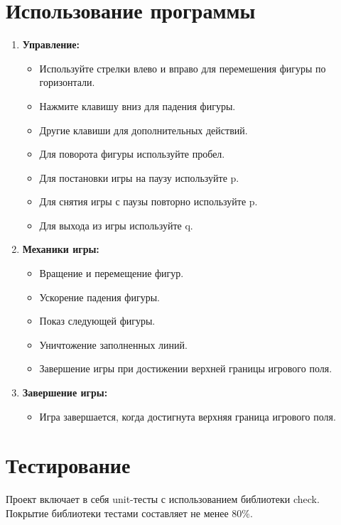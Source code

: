 \documentclass[a4paper,12pt]{article}
\begin{document}
\section{Использование программы}

\begin{enumerate}
    \item \textbf{Управление:}
        \begin{itemize}
            \item Используйте стрелки влево и вправо для перемешения фигуры по горизонтали.
            \item Нажмите клавишу вниз для падения фигуры.
            \item Другие клавиши для дополнительных действий.
            \item Для поворота фигуры используйте пробел.
            \item Для постановки игры на паузу используйте p.
            \item Для снятия игры с паузы повторно используйте p.
            \item Для выхода из игры используйте q.
        \end{itemize}
    \item \textbf{Механики игры:}
        \begin{itemize}
            \item Вращение и перемещение фигур.
            \item Ускорение падения фигуры.
            \item Показ следующей фигуры.
            \item Уничтожение заполненных линий.
            \item Завершение игры при достижении верхней границы игрового поля.
        \end{itemize}
    \item \textbf{Завершение игры:}
        \begin{itemize}
            \item Игра завершается, когда достигнута верхняя граница игрового поля.
        \end{itemize}
\end{enumerate}

\section{Тестирование}

Проект включает в себя unit-тесты с использованием библиотеки check. Покрытие библиотеки тестами составляет не менее 80\%.
\end{document}
